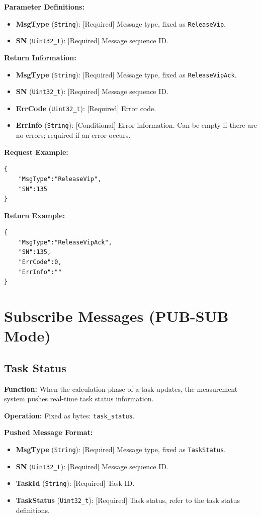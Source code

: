 \documentclass[12pt, a4paper]{article}
\begin{document}
\textbf{Parameter Definitions:}
\begin{itemize}
    \item \textbf{MsgType} (\texttt{String}): [Required] Message type, fixed as \texttt{ReleaseVip}.
    \item \textbf{SN} (\texttt{Uint32\_t}): [Required] Message sequence ID.
\end{itemize}

\textbf{Return Information:}
\begin{itemize}
    \item \textbf{MsgType} (\texttt{String}): [Required] Message type, fixed as \texttt{ReleaseVipAck}.
    \item \textbf{SN} (\texttt{Uint32\_t}): [Required] Message sequence ID.
    \item \textbf{ErrCode} (\texttt{Uint32\_t}): [Required] Error code.
    \item \textbf{ErrInfo} (\texttt{String}): [Conditional] Error information. Can be empty if there are no errors; required if an error occurs.
\end{itemize}

\noindent \textbf{Request Example:}
\begin{lstlisting}
{
    "MsgType":"ReleaseVip",
    "SN":135
}
\end{lstlisting}

\noindent \textbf{Return Example:}
\begin{lstlisting}
{
    "MsgType":"ReleaseVipAck",
    "SN":135,
    "ErrCode":0,
    "ErrInfo":""
}
\end{lstlisting}

\section{Subscribe Messages (PUB-SUB Mode)}

\subsection{Task Status}

\textbf{Function:} When the calculation phase of a task updates, the measurement system pushes real-time task status information.

\textbf{Operation:} Fixed as bytes: \texttt{task\_status}.

\textbf{Pushed Message Format:}
\begin{itemize}
    \item \textbf{MsgType} (\texttt{String}): [Required] Message type, fixed as \texttt{TaskStatus}.
    \item \textbf{SN} (\texttt{Uint32\_t}): [Required] Message sequence ID.
    \item \textbf{TaskId} (\texttt{String}): [Required] Task ID.
    \item \textbf{TaskStatus} (\texttt{Uint32\_t}): [Required] Task status, refer to the task status definitions.
\end{itemize}
\end{document}
